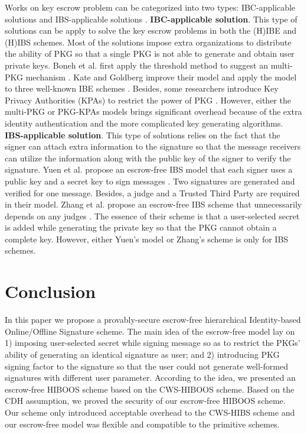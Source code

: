 \documentclass[times]{secauth}
\theoremstyle{definition}
\theoremstyle{remark}
\begin{document}
Works on key escrow problem can be categorized into two types: IBC-applicable solutions \cite{boneh2001identity,kate2010distributed,lee2004secure,cao2011sa,wang2015thibe} and IBS-applicable solutions \cite{zhang2012efficient,yuen2010construct,ogiela2012linguistic}.
\textbf{IBC-applicable solution}. This type of solutions can be apply to solve the key escrow problems in both the (H)IBE and (H)IBS schemes.
Most of the solutions impose extra organizations to distribute the ability of PKG so that a single PKG is not able to generate and obtain user private keys.  
Boneh et al. first apply the threshold method to suggest an multi-PKG mechanism \cite{boneh2001identity}. 
Kate and Goldberg improve their model and apply the model to three well-known IBE schemes \cite{kate2010distributed}. 
Besides, some researchers introduce Key Privacy Authorities (KPAs) to restrict the power of PKG \cite{lee2004secure,cao2011sa,wang2015thibe}. 
However, either the multi-PKG or PKG-KPAs models brings significant overhead because of the extra identity authentication and the more complicated key generating algorithms.
\textbf{IBS-applicable solution}. This type of solutions relies on the fact that the signer can attach extra information to the signature so that the message receivers can utilize the information along with the public key of the signer to verify the signature.
Yuen et al. propose an escrow-free IBS model that each signer uses a public key and a secret key to sign messages \cite{yuen2010construct}. 
Two signatures are generated and verified for one message.
Besides, a judge and a Trusted Third Party are required in their model.
Zhang et al. propose an escrow-free IBS scheme that unnecessarily depends on any judges \cite{zhang2012efficient}. 
The essence of their scheme is that a user-selected secret is added while generating the private key so that the PKG cannot obtain a complete key. 
However, either Yuen's model or Zhang's scheme is only for IBS schemes. 

\section{Conclusion}\label{sec-conclusion}
In this paper we propose a provably-secure escrow-free hierarchical Identity-based Online/Offline Signature scheme.
The main idea of the escrow-free model lay on 1) imposing user-selected secret while signing message so as to restrict the PKGs' ability of generating an identical signature as user; and 2) introducing PKG signing factor to the signature so that the user could not generate well-formed signatures with different user parameter.
According to the idea, we presented an escrow-free HIBOOS scheme based on the CWS-HIBOOS scheme.
Based on the CDH assumption, we proved the security of our escrow-free HIBOOS scheme.
Our scheme only introduced acceptable overhead to the CWS-HIBS scheme and our escrow-free model was flexible and compatible to the primitive schemes. 
\par
\end{document}
